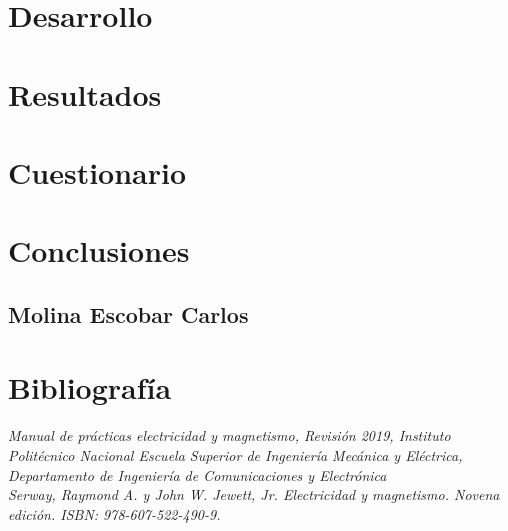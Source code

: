 \documentclass[11pt]{article}
\begin{document}
\begin{multicols}{2}
\begin{itemize}
	\end{itemize}

\section{Desarrollo}

		

\section{Resultados}
	


\section{Cuestionario}


\section{Conclusiones}

		\subsection{Molina Escobar Carlos}

														
\section{Bibliografía}

\textit{Manual de prácticas electricidad y magnetismo, Revisión 2019, Instituto Politécnico Nacional Escuela Superior de Ingeniería Mecánica y Eléctrica, Departamento de Ingeniería de Comunicaciones y Electrónica}\\
\textit{Serway, Raymond A. y John W. Jewett, Jr. Electricidad y magnetismo. Novena edición. ISBN: 978-607-522-490-9.}

\end{multicols}
\end{document}
